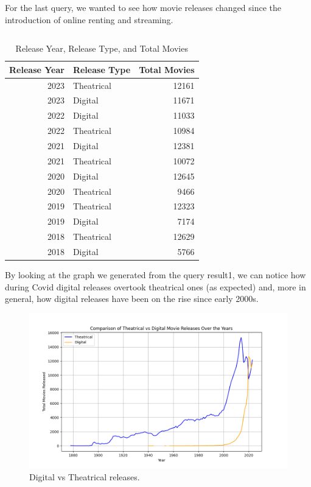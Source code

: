 \documentclass{Configuration_Files/PoliMi3i_thesis}
\begin{document}
 For the last query, we wanted to see how movie releases changed since the introduction of online renting and streaming.

 \inputminted[frame=single,framesep=10pt,breaklines]{cypher}{letterboxd/queries/query10.cypher}

 \begin{table}[!h]
\centering
\begin{tabular}{|r|l|r|}
\hline
\textbf{Release Year} & \textbf{Release Type} & \textbf{Total Movies} \\
\hline
2023 & Theatrical & 12161 \\
2023 & Digital & 11671 \\
2022 & Digital & 11033 \\
2022 & Theatrical & 10984 \\
2021 & Digital & 12381 \\
2021 & Theatrical & 10072 \\
2020 & Digital & 12645 \\
2020 & Theatrical & 9466 \\
2019 & Theatrical & 12323 \\
2019 & Digital & 7174 \\
2018 & Theatrical & 12629 \\
2018 & Digital & 5766 \\
\hline
\end{tabular}
\caption{Release Year, Release Type, and Total Movies}
\end{table}

 By looking at the graph we generated from the query result1, we can notice how during Covid digital releases overtook theatrical ones (as expected) and, more in general, how digital releases have been on the rise since early 2000s.

\begin{figure}[!h]
  \centering
  \includegraphics[width=\textwidth]{Project Template/letterboxd/visualization/releases.png}
  \caption{Digital vs Theatrical releases.}
  \label{fig:releases}
\end{figure}
\end{document}
